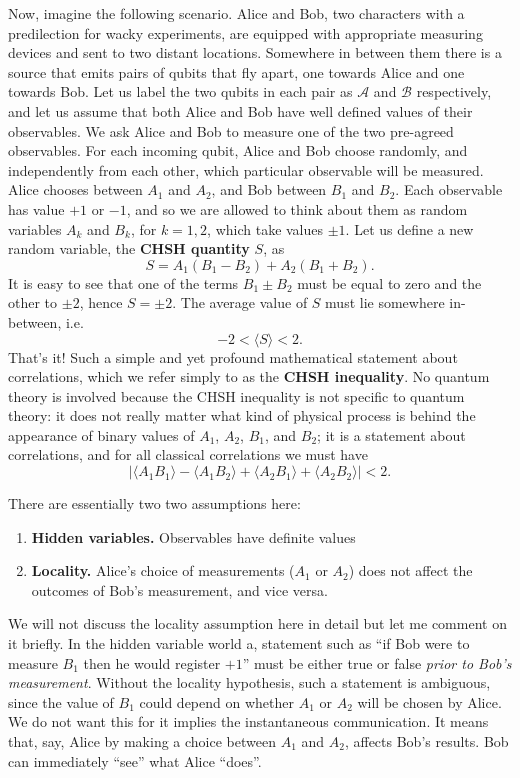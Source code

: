 \documentclass[fleqn]{article}
\providecommand{\tightlist}{%
  \setlength{\itemsep}{0pt}\setlength{\parskip}{0pt}}
\begin{document}
Now, imagine the following scenario.
Alice and Bob, two characters with a predilection for wacky experiments, are equipped with appropriate measuring devices and sent to two distant locations.
Somewhere in between them there is a source that emits pairs of qubits that fly apart, one towards Alice and one towards Bob.
Let us label the two qubits in each pair as \(\mathcal{A}\) and \(\mathcal{B}\) respectively, and let us assume that both Alice and Bob have well defined values of their observables.
We ask Alice and Bob to measure one of the two pre-agreed observables.
For each incoming qubit, Alice and Bob choose randomly, and independently from each other, which particular observable will be measured.
Alice chooses between \(A_1\) and \(A_2\), and Bob between \(B_1\) and \(B_2\).
Each observable has value \(+1\) or \(-1\), and so we are allowed to think about them as random variables \(A_k\) and \(B_k\), for \(k=1,2\), which take values \(\pm 1\).
Let us define a new random variable, the \textbf{CHSH quantity} \(S\), as
\[
  S = A_1(B_1 - B_2) + A_2(B_1 + B_2).
\]
It is easy to see that one of the terms \(B_1\pm B_2\) must be equal to zero and the other to \(\pm 2\), hence \(S=\pm2\).
The average value of \(S\) must lie somewhere in-between, i.e.
\[
  -2 < \langle S\rangle < 2.
\]
That's it!
Such a simple and yet profound mathematical statement about correlations, which we refer simply to as the \textbf{CHSH inequality}.
No quantum theory is involved because the CHSH inequality is not specific to quantum theory: it does not really matter what kind of physical process is behind the appearance of binary values of \(A_1\), \(A_2\), \(B_1\), and \(B_2\); it is a statement about correlations, and for all classical correlations we must have
\[
  |
    \langle A_1 B_1\rangle - \langle A_1 B_2\rangle + \langle A_2 B_1\rangle + \langle A_2 B_2\rangle
  | < 2.
\]

There are essentially two two assumptions here:

\begin{enumerate}
\def\labelenumi{\arabic{enumi}.}
\tightlist
\item
  \textbf{Hidden variables.} Observables have definite values
\item
  \textbf{Locality.} Alice's choice of measurements (\(A_1\) or \(A_2\)) does not affect the outcomes of Bob's measurement, and vice versa.
\end{enumerate}

We will not discuss the locality assumption here in detail but let me comment on it briefly.
In the hidden variable world a, statement such as ``if Bob were to measure \(B_1\) then he would register \(+1\)'' must be either true or false \emph{prior to Bob's measurement}.
Without the locality hypothesis, such a statement is ambiguous, since the value of \(B_1\) could depend on whether \(A_1\) or \(A_2\) will be chosen by Alice.
We do not want this for it implies the instantaneous communication.
It means that, say, Alice by making a choice between \(A_1\) and \(A_2\), affects Bob's results.
Bob can immediately ``see'' what Alice ``does''.
\end{document}
